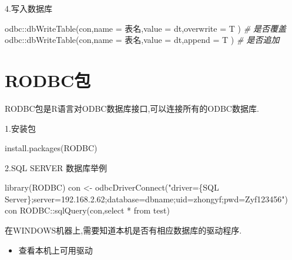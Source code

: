 \documentclass[
]{book}
\newenvironment{Shaded}{\begin{snugshade}}{\end{snugshade}}
\newcommand{\AttributeTok}[1]{\textcolor[rgb]{0.77,0.63,0.00}{#1}}
\newcommand{\CommentTok}[1]{\textcolor[rgb]{0.56,0.35,0.01}{\textit{#1}}}
\newcommand{\FunctionTok}[1]{\textcolor[rgb]{0.00,0.00,0.00}{#1}}
\newcommand{\NormalTok}[1]{#1}
\newcommand{\OtherTok}[1]{\textcolor[rgb]{0.56,0.35,0.01}{#1}}
\newcommand{\SpecialCharTok}[1]{\textcolor[rgb]{0.00,0.00,0.00}{#1}}
\newcommand{\StringTok}[1]{\textcolor[rgb]{0.31,0.60,0.02}{#1}}
\providecommand{\tightlist}{%
  \setlength{\itemsep}{0pt}\setlength{\parskip}{0pt}}
\begin{document}
4.写入数据库

\begin{Shaded}
\begin{Highlighting}[]
\NormalTok{odbc}\SpecialCharTok{::}\FunctionTok{dbWriteTable}\NormalTok{(con,}\AttributeTok{name =} \StringTok{\textquotesingle{}表名\textquotesingle{}}\NormalTok{,}\AttributeTok{value =}\NormalTok{ dt,}\AttributeTok{overwrite =}\NormalTok{ T ) }\CommentTok{\# 是否覆盖}
\NormalTok{odbc}\SpecialCharTok{::}\FunctionTok{dbWriteTable}\NormalTok{(con,}\AttributeTok{name =} \StringTok{\textquotesingle{}表名\textquotesingle{}}\NormalTok{,}\AttributeTok{value =}\NormalTok{ dt,}\AttributeTok{append =}\NormalTok{ T ) }\CommentTok{\# 是否追加}
\end{Highlighting}
\end{Shaded}

\hypertarget{rodbcux5305}{%
\section{RODBC包}\label{rodbcux5305}}

RODBC包是R语言对ODBC数据库接口,可以连接所有的ODBC数据库.

1.安装包

\begin{Shaded}
\begin{Highlighting}[]
\FunctionTok{install.packages}\NormalTok{(}\StringTok{\textquotesingle{}RODBC\textquotesingle{}}\NormalTok{)}
\end{Highlighting}
\end{Shaded}

2.SQL SERVER 数据库举例

\begin{Shaded}
\begin{Highlighting}[]
\FunctionTok{library}\NormalTok{(RODBC)}
\NormalTok{con }\OtherTok{\textless{}{-}} \FunctionTok{odbcDriverConnect}\NormalTok{(}\StringTok{"driver=\{SQL Server\};server=192.168.2.62;database=dbname;uid=zhongyf;pwd=Zyf123456"}\NormalTok{)}
\NormalTok{con}
\NormalTok{RODBC}\SpecialCharTok{::}\FunctionTok{sqlQuery}\NormalTok{(con,}\StringTok{\textquotesingle{}select * from test\textquotesingle{}}\NormalTok{)}
\end{Highlighting}
\end{Shaded}

在WINDOWS机器上,需要知道本机是否有相应数据库的驱动程序.

\begin{itemize}
\tightlist
\item
  查看本机上可用驱动
\end{itemize}
\end{document}

